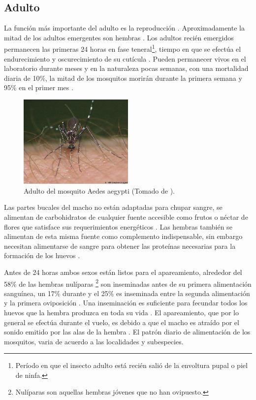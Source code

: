 \subsection{Adulto}
\label{subsec:ciclo-biologico-adulto}
La función más importante del adulto es la reproducción \cite{ThironIzcazaJ2003}. Aproximadamente
la mitad de los adultos emergentes son hembras \cite{otero2006stochastic, manrique1998desarrollo}.
Los adultos recién emergidos permanecen las primeras 24 horas en fase teneral\footnote{Período en
que el insecto adulto está recién salió de la envoltura pupal o piel de ninfa.}, tiempo en que se
efectúa el endurecimiento y oscurecimiento de su cutícula \cite{luevano1993ciclo}. Pueden
permanecer vivos en el laboratorio durante meses y en la naturaleza pocas semanas, con una
mortalidad diaria de 10\%, la mitad de los mosquitos morirán durante la primera semana y 95\% en
el primer mes \cite{ThironIzcazaJ2003}.

\begin{figure}[!htbp]
\centering
\includegraphics[width=0.5\textwidth]{capitulo-3/graphics/adulto.png}
\caption{\label{fig:cap3-larvas} Adulto del mosquito Aedes aegypti (Tomado de
\cite{directricesDetvArg}).}
\end{figure}

Las partes bucales del macho no están adaptadas para chupar sangre, se alimentan de carbohidratos
de cualquier fuente accesible como frutos o néctar de flores que satisface sus requerimientos
energéticos \cite{ThironIzcazaJ2003}. Las hembras también se alimentan de esta misma fuente como
complemento indispensable, sin embargo necesitan alimentarse de sangre para obtener las proteínas
necesarias para la formación de los huevos \cite{ThironIzcazaJ2003}.

Antes de 24 horas ambos sexos están listos para el apareamiento, alrededor del 58\% de las hembras
nulíparas \footnote{Nulíparas son aquellas hembras jóvenes que no han ovipuesto.} son inseminadas
antes de su primera alimentación sanguínea, un 17\% durante y el 25\% es inseminada entre la
segunda alimentación y la primera oviposición \cite{ThironIzcazaJ2003}. Una inseminación es
suficiente para fecundar todos los huevos que la hembra produzca en toda su vida
\cite{ThironIzcazaJ2003}. El apareamiento, que por lo general se efectúa durante el vuelo, es
debido a que el macho es atraído por el sonido emitido por las alas de la hembra
\cite{ThironIzcazaJ2003}. El patrón diario de alimentación de los mosquitos, varia de acuerdo a
las localidades y subespecies\cite{luevano1993ciclo}.

